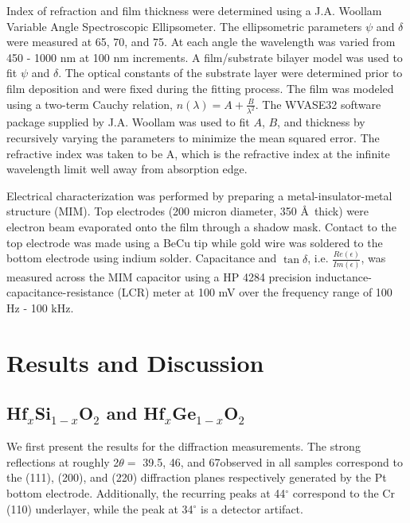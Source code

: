 Index of refraction and film thickness were determined using a J.A. Woollam Variable Angle Spectroscopic Ellipsometer. The ellipsometric parameters $\psi$ and $\delta$ were measured at 65\textdegree, 70\textdegree, and 75\textdegree. At each angle the wavelength was varied from 450 - 1000 nm at 100 nm increments. A film/substrate bilayer model was used to fit $\psi$ and $\delta$. The optical constants of the substrate layer were determined prior to film deposition and were fixed during the fitting process. The film was modeled using a two-term Cauchy relation, $n(\lambda) =  A + \frac{B}{\lambda^{2}}$. The WVASE32 software package supplied by J.A. Woollam was used to fit $A$, $B$, and thickness by recursively varying the parameters to minimize the mean squared error. The refractive index was taken to be A, which is the refractive index at the infinite wavelength limit well away from absorption edge.

Electrical characterization was performed by preparing a metal-insulator-metal structure (MIM). Top electrodes (200 micron diameter, 350 \AA\ thick) were electron beam evaporated onto the film through a shadow mask. Contact to the top electrode was made using a BeCu tip while gold wire was soldered to the bottom electrode using indium solder. Capacitance and $\tan\delta$, i.e. $\frac{Re(\epsilon)}{Im(\epsilon)}$, was measured across the MIM capacitor using a HP 4284 precision inductance-capacitance-resistance (LCR) meter at 100 mV over the frequency range of 100 Hz - 100 kHz. 

\section{Results and Discussion} 

\subsection{Hf$_{x}$Si$_{1-x}$O$_{2}$ and Hf$_{x}$Ge$_{1-x}$O$_{2}$}

We first present the results for the diffraction measurements. The strong reflections at roughly 2$\theta =$ 39.5\textdegree, 46\textdegree, and 67\textdegree observed in all samples correspond to the (111), (200), and (220) diffraction planes respectively generated by the Pt bottom electrode. Additionally, the recurring peaks at 44$^{\circ}$ correspond to the Cr (110) underlayer, while the peak at 34$^{\circ}$ is a detector artifact. 

